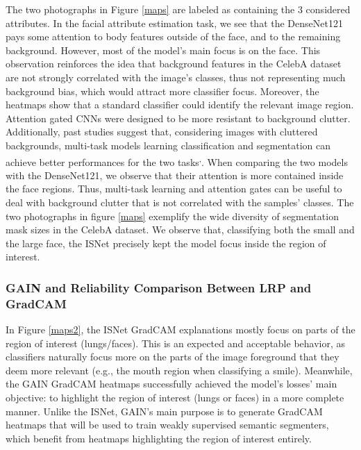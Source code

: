 \documentclass[fleqn,10pt]{wlscirep}
\begin{document}
{The two photographs in Figure \ref{maps} are labeled as containing the 3 considered attributes. In the facial attribute estimation task, we see that the DenseNet121 pays some attention to body features outside of the face, and to the remaining background. However, most of the model's main focus is on the face. This observation reinforces the idea that background features in the CelebA dataset are not strongly correlated with the image's classes, thus not representing much background bias, which would attract more classifier focus. Moreover, the heatmaps show that a standard classifier could identify the relevant image region. Attention gated CNNs were designed to be more resistant to background clutter\cite{AGNet}. Additionally, past studies suggest that, considering images with cluttered backgrounds, multi-task models learning classification and segmentation can achieve better performances for the two tasks\cite{MultiTask1}\textsuperscript{,}\cite{MultiTask2}. When comparing the two models with the DenseNet121, we observe that their attention is more contained inside the face regions. Thus, multi-task learning and attention gates can be useful to deal with background clutter that is not correlated with the samples' classes. The two photographs in figure \ref{maps} exemplify the wide diversity of segmentation mask sizes in the CelebA dataset. We observe that, classifying both the small and the large face, the ISNet precisely kept the model focus inside the region of interest.

\subsubsection{GAIN and Reliability Comparison Between LRP and GradCAM}
\label{GAINComparison}

In Figure \ref{maps2}, the ISNet GradCAM explanations mostly focus on parts of the region of interest (lungs/faces). This is an expected and acceptable behavior, as classifiers naturally focus more on the parts of the image foreground that they deem more relevant\cite{GAIN} (e.g., the mouth region when classifying a smile). Meanwhile, the GAIN GradCAM heatmaps successfully achieved the model's losses' main objective\cite{GAIN}: to highlight the region of interest (lungs or faces) in a more complete manner. Unlike the ISNet, GAIN's main purpose is to generate GradCAM heatmaps that will be used to train weakly supervised semantic segmenters, which benefit from heatmaps highlighting the region of interest entirely\cite{GAIN}.

}
\end{document}
